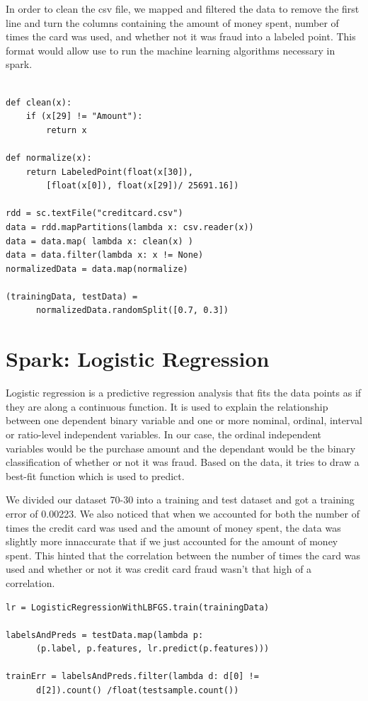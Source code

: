 \documentclass[9pt,twocolumn,twoside]{idsi}
\begin{document}
In order to clean the csv file, we mapped and filtered the data to remove the first line and turn the columns containing the amount of money spent, number of times the card was used, and whether not it was fraud into a labeled point. This format would allow use to run the machine learning algorithms necessary in spark. 
\begin{verbatim}

def clean(x):
    if (x[29] != "Amount"):
        return x
        
def normalize(x):
    return LabeledPoint(float(x[30]), 
    	[float(x[0]), float(x[29])/ 25691.16])

rdd = sc.textFile("creditcard.csv")
data = rdd.mapPartitions(lambda x: csv.reader(x))
data = data.map( lambda x: clean(x) )
data = data.filter(lambda x: x != None)
normalizedData = data.map(normalize)

(trainingData, testData) = 
      normalizedData.randomSplit([0.7, 0.3]) 
 \end{verbatim}

\section{Spark: Logistic Regression}
Logistic regression is a predictive regression analysis that fits the data points as if they are along a continuous function.  It is used to explain the relationship between one dependent binary variable and one or more nominal, ordinal, interval or ratio-level independent variables. In our case, the ordinal independent variables would be the purchase amount and the dependant would be the binary classification of whether or not it was fraud.  Based on the data, it tries to draw a best-fit function which is used to predict. 

We divided our dataset 70-30 into a training and test dataset and got a training error of 0.00223. We also noticed that when we accounted for both the number of times the credit card was used and the amount of money spent, the data was slightly more innaccurate that if we just accounted for the amount of money spent. This hinted that the correlation between the number of times the card was used and whether or not it was credit card fraud wasn’t that high of a correlation. 
\begin{verbatim}
lr = LogisticRegressionWithLBFGS.train(trainingData)

labelsAndPreds = testData.map(lambda p: 
      (p.label, p.features, lr.predict(p.features)))
      
trainErr = labelsAndPreds.filter(lambda d: d[0] != 
      d[2]).count() /float(testsample.count())

\end{verbatim}
\end{document}
